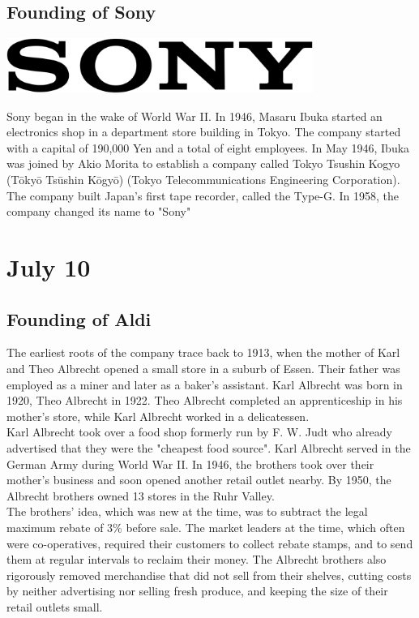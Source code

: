 \documentclass[11pt]{report}
\begin{document}
\subsection{Founding of Sony}
\vspace{2mm}\begin{center}\includegraphics[width=10cm]{./img/sonylogo.jpg}\end{center}
Sony began in the wake of World War II. In 1946, Masaru Ibuka started an electronics shop in a department store building in Tokyo. The company started with a capital of 190,000 Yen and a total of eight employees. In May 1946, Ibuka was joined by Akio Morita to establish a company called Tokyo Tsushin Kogyo (Tōkyō Tsūshin Kōgyō) (Tokyo Telecommunications Engineering Corporation). The company built Japan's first tape recorder, called the Type-G. In 1958, the company changed its name to "Sony"
\section{July 10}
\subsection{Founding of Aldi}
The earliest roots of the company trace back to 1913, when the mother of Karl and Theo Albrecht opened a small store in a suburb of Essen. Their father was employed as a miner and later as a baker's assistant. Karl Albrecht was born in 1920, Theo Albrecht in 1922. Theo Albrecht completed an apprenticeship in his mother's store, while Karl Albrecht worked in a delicatessen.\\
\indent Karl Albrecht took over a food shop formerly run by F. W. Judt who already advertised that they were the "cheapest food source". Karl Albrecht served in the German Army during World War II. In 1946, the brothers took over their mother's business and soon opened another retail outlet nearby. By 1950, the Albrecht brothers owned 13 stores in the Ruhr Valley.\\
\indent The brothers' idea, which was new at the time, was to subtract the legal maximum rebate of 3\% before sale. The market leaders at the time, which often were co-operatives, required their customers to collect rebate stamps, and to send them at regular intervals to reclaim their money. The Albrecht brothers also rigorously removed merchandise that did not sell from their shelves, cutting costs by neither advertising nor selling fresh produce, and keeping the size of their retail outlets small.
\end{document}
